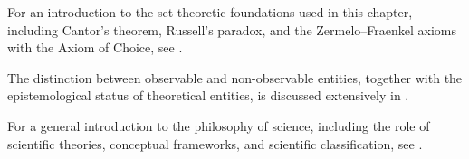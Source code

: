 For an introduction to the set-theoretic foundations used in this chapter, including Cantor's theorem, Russell's paradox, and the Zermelo--Fraenkel axioms with the Axiom of Choice, see \cite{jech2013set}.

The distinction between observable and non-observable entities, together with the epistemological status of
theoretical entities, is discussed extensively in \cite{van1980scientific}.

For a general introduction to the philosophy of science, including the role of scientific theories, conceptual
frameworks, and scientific classification, see \cite{chalmers2013thing}.



